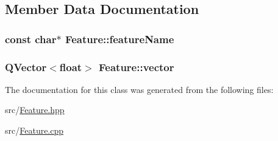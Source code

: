 \subsection{Member Data Documentation}
\hypertarget{class_feature_aaeb59834a8cafa7a89fc7a02f861f37d}{
\subsubsection[{feature\+Name}]{\setlength{\rightskip}{0pt plus 5cm}const char$\ast$ Feature\+::feature\+Name\hspace{0.3cm}{\ttfamily [private]}}}\label{class_feature_aaeb59834a8cafa7a89fc7a02f861f37d}
\hypertarget{class_feature_a8158dfca752942aeb84f35c363184d95}{
\subsubsection[{vector}]{\setlength{\rightskip}{0pt plus 5cm}Q\+Vector$<$float$>$ Feature\+::vector\hspace{0.3cm}{\ttfamily [private]}}}\label{class_feature_a8158dfca752942aeb84f35c363184d95}


The documentation for this class was generated from the following files\+:\begin{DoxyCompactItemize}
\item 
src/\hyperlink{_feature_8hpp}{Feature.\+hpp}\item 
src/\hyperlink{_feature_8cpp}{Feature.\+cpp}\end{DoxyCompactItemize}
